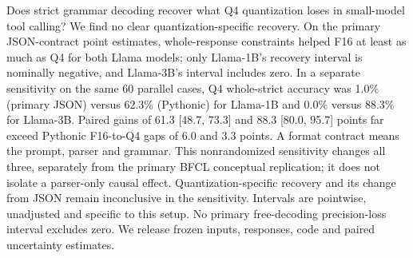 Does strict grammar decoding recover what Q4 quantization loses in small-model tool calling? We find no clear quantization-specific recovery. On the primary JSON-contract point estimates, whole-response constraints helped F16 at least as much as Q4 for both Llama models; only Llama-1B's recovery interval is nominally negative, and Llama-3B's interval includes zero. In a separate sensitivity on the same 60 parallel cases, Q4 whole-strict accuracy was 1.0\% (primary JSON) versus 62.3\% (Pythonic) for Llama-1B and 0.0\% versus 88.3\% for Llama-3B. Paired gains of 61.3 [48.7, 73.3] and 88.3 [80.0, 95.7] points far exceed Pythonic F16-to-Q4 gaps of 6.0 and 3.3 points. A format contract means the prompt, parser and grammar. This nonrandomized sensitivity changes all three, separately from the primary BFCL conceptual replication; it does not isolate a parser-only causal effect. Quantization-specific recovery and its change from JSON remain inconclusive in the sensitivity. Intervals are pointwise, unadjusted and specific to this setup. No primary free-decoding precision-loss interval excludes zero. We release frozen inputs, responses, code and paired uncertainty estimates.

